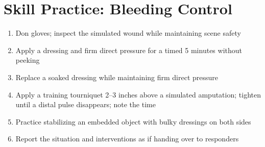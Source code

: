 \section{Skill Practice: Bleeding Control}

\begin{enumerate}[leftmargin=*]
\item Don gloves; inspect the simulated wound while maintaining scene safety
\item Apply a dressing and firm direct pressure for a timed 5 minutes without peeking
\item Replace a soaked dressing while maintaining firm direct pressure
\item Apply a training tourniquet 2--3 inches above a simulated amputation; tighten until a distal pulse disappears; note the time
\item Practice stabilizing an embedded object with bulky dressings on both sides
\item Report the situation and interventions as if handing over to responders
\end{enumerate}
